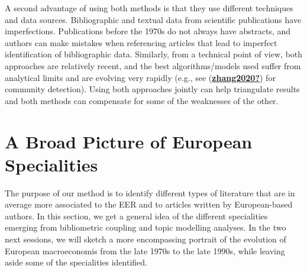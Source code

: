 \documentclass[]{elsarticle} %
\begin{document}
A second advantage of using both methods is that they use different
techniques and data sources. Bibliographic and textual data from
scientific publications have imperfections. Publications before the
1970s do not always have abstracts, and authors can make mistakes when
referencing articles that lead to imperfect identification of
bibliographic data. Similarly, from a technical point of view, both
approaches are relatively recent, and the best algorithms/models used
suffer from analytical limits and are evolving very rapidly (e.g., see
(\protect\hyperlink{ref-zhang2020}{\textbf{zhang2020?}}) for community
detection). Using both approaches jointly can help triangulate results
and both methods can compensate for some of the weaknesses of the other.

\hypertarget{a-broad-picture-of-european-specialities}{%
\section{A Broad Picture of European
Specialities}\label{a-broad-picture-of-european-specialities}}

The purpose of our method is to identify different types of literature
that are in average more associated to the EER and to articles written
by European-based authors. In this section, we get a general idea of the
different specialities emerging from bibliometric coupling and topic
modelling analyses. In the two next sessions, we will sketch a more
encompassing portrait of the evolution of European macroeconomis from
the late 1970s to the late 1990s, while leaving aside some of the
specialities identified.
\end{document}
